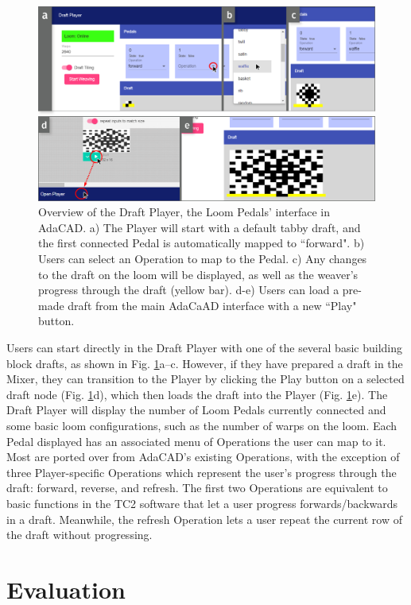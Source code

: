 \begin{figure}
    \centering
    \includegraphics[width=0.9\linewidth]{figs/LP_gui_v2.png}
    \caption[Overview of the Draft Player, the Loom Pedals' interface in AdaCAD.]{Overview of the Draft Player, the Loom Pedals' interface in AdaCAD. a) The Player will start with a default tabby draft, and the first connected Pedal is automatically mapped to ``forward". b) Users can select an Operation to map to the Pedal. c) Any changes to the draft on the loom will be displayed, as well as the weaver's progress through the draft (yellow bar). d-e) Users can load a pre-made draft from the main AdaCaAD interface with a new ``Play" button.}
    \label{fig:draft-player-gui}
\end{figure}

Users can start directly in the Draft Player with one of the several basic building block drafts, as shown in Fig. \ref{fig:draft-player-gui}a--c. However, if they have prepared a draft in the Mixer, they can transition to the Player by clicking the Play button on a selected draft node (Fig. \ref{fig:draft-player-gui}d), which then loads the draft into the Player (Fig. \ref{fig:draft-player-gui}e). The Draft Player will display the number of Loom Pedals currently connected and some basic loom configurations, such as the number of warps on the loom. Each Pedal displayed has an associated menu of Operations the user can map to it. Most are ported over from AdaCAD’s existing Operations, with the exception of three Player-specific Operations which represent the user’s progress through the draft: forward, reverse, and refresh. The first two Operations are equivalent to basic functions in the TC2 software that let a user progress forwards/backwards in a draft. Meanwhile, the refresh Operation lets a user repeat the current row of the draft without progressing.

\section{Evaluation}

